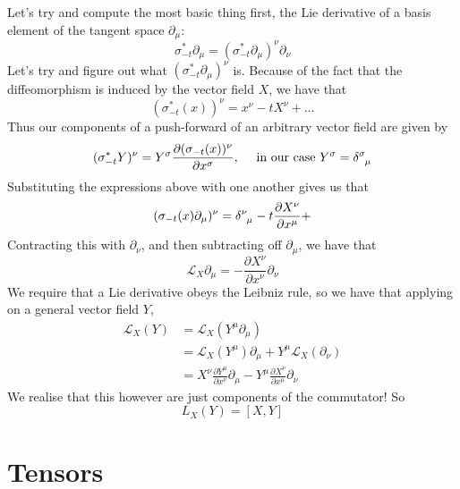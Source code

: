 \documentclass[11pt, a4paper]{article}   	%
\theoremstyle{slplain}
\begin{document}
Let's try and compute the most basic thing first, the Lie derivative of a basis element of the tangent space  $\partial_\mu$: 
\[
\sigma_{ -t}^* \partial_\mu = (\sigma_{ -t}^* \partial_\mu)^\nu \partial_\nu
\] Let's try and figure out what $ (\sigma_{ -t}^* \partial_\mu)^\nu$ is. Because of the fact that the diffeomorphism is induced by the vector field $X$, we have that 
\[
( \sigma_{ -t}^* (x))^\nu = x^\nu  - t X^\nu + \dots
\] Thus our components of a push-forward of an arbitrary vector field are given by 
\[ 
( \sigma_{ -t}^*  Y )^\nu  = Y^\sigma \frac{ \partial ( \sigma_{ -t } ( x) )^\nu}{ \partial x^\sigma } , \quad \text{ in our case }  Y^\sigma = \delta\indices{^\sigma_\mu} 
\] 
Substituting the expressions above with one another gives us that 
\[ 
( \sigma_{ -t} ( x) \partial_\mu )^\nu  = \delta\indices{^\nu_\mu}  - t \frac{ \partial X^\nu }{ \partial x^\mu } + 
\] Contracting this with $\partial_\nu$, and then subtracting off $\partial_\mu$, we have that
\[ 
\mathcal{L}_X \partial_\mu =  - \frac{ \partial X^\nu}{ \partial x^\nu} \partial_\nu 
\] We require that a Lie derivative obeys the Leibniz rule, so we have that applying on a general vector field $Y$, 
\begin{align*}
\mathcal{L}_X (Y)  & = \mathcal{L}_X( Y^\mu \partial_\mu ) \\
				&= \mathcal{L}_X ( Y^\mu ) \partial_\mu + Y^\mu \mathcal{L}_X ( \partial_\nu ) \\
				&= X^\nu \frac{ \partial Y^\mu }{ \partial x^\nu } \partial_\mu - Y^\mu \frac{ \partial X^\nu } { \partial x^\mu } \partial_\nu 
\end{align*} 
We realise that this however are just components of the commutator! So
\[
L_X ( Y ) = [ X, Y ] 
\] 

\section{Tensors} 
\end{document}
